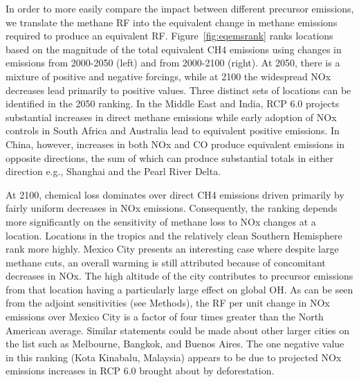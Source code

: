 In order to more easily compare the impact between different precursor emissions, we translate the methane RF into the equivalent change in methane emissions required to produce an equivalent RF. Figure~\ref{fig:eqemsrank} ranks locations based on the magnitude of the total equivalent CH4 emissions using changes in emissions from 2000-2050 (left) and from 2000-2100 (right). At 2050, there is a mixture of positive and negative forcings, while at 2100 the widespread NOx decreases lead primarily to positive values. Three distinct sets of locations can be identified in the 2050 ranking. In the Middle East and India, RCP 6.0 projects substantial increases in direct methane emissions  while early adoption of NOx controls in South Africa and Australia lead to equivalent positive emissions. In China, however, increases in both NOx and CO produce  equivalent emissions in opposite directions, the sum of which can produce substantial totals in either direction e.g., Shanghai and the Pearl River Delta.

At 2100, chemical loss dominates over direct CH4 emissions driven primarily by  fairly uniform decreases in NOx emissions.  Consequently, the ranking depends more significantly on  the sensitivity of methane loss to NOx changes at a location. Locations in the tropics and the relatively clean Southern Hemisphere rank more highly. Mexico City presents an interesting case where despite large methane cuts, an overall warming is still attributed because of concomitant decreases in NOx. The high altitude of the city contributes to precursor emissions from that location having a particularly large effect on global OH. As can be seen from the adjoint sensitivities (see Methods), the RF per unit change in NOx emissions over Mexico City is a factor of four times greater than the North American average. Similar statements could be made about other larger cities on the list such as Melbourne, Bangkok, and Buenos Aires. The one negative value in this ranking (Kota Kinabalu, Malaysia) appears to be due to projected NOx emissions increases in RCP 6.0 brought about by deforestation.